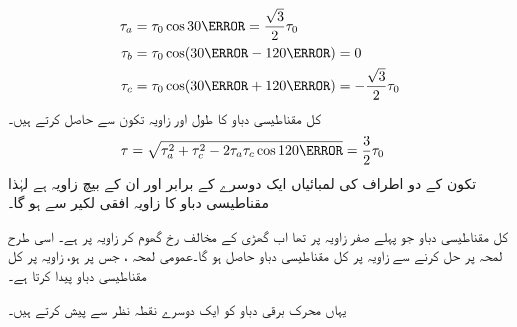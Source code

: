 %
\begin{gather}
\begin{aligned}
\tau_a&=\tau_0 \cos 30\degree=\frac{\sqrt{3}}{2} \tau_0\\
\tau_b&=\tau_0 \cos (30\degree-120\degree)=0\\
\tau_c&=\tau_0 \cos (30\degree+120\degree)=-\frac{\sqrt{3}}{2} \tau_0
\end{aligned}
\end{gather}
%
کل مقناطیسی دباو کا طول   اور زاویہ تکون  سے حاصل کرتے ہیں۔
\begin{align}
\tau&=\sqrt{\tau_a^2+\tau_c^2-2 \tau_a \tau_c \cos 120\degree}=\frac{3}{2}\tau_0
\end{align}
تکون کے دو اطراف کی لمبائیاں ایک دوسرے کے برابر  اور ان کے بیچ زاویہ  ہے  لہٰذا مقناطیسی دباو کا زاویہ افقی لکیر سے   ہو گا۔

کل مقناطیسی دباو جو پہلے صفر زاویہ پر تھا اب  گھڑی کے مخالف رخ گھوم کر   زاویہ پر ہے۔ اسی طرح لمحہ   پر حل کرنے سے   زاویہ      پر کل مقناطیسی دباو    حاصل ہو گا۔عمومی لمحہ ، جس پر    ہو، زاویہ   پر  کل مقناطیسی دباو    پیدا کرتا ہے۔

یہاں محرک برقی دباو کو  ایک دوسرے نقطہ نظر سے پیش کرتے ہیں۔

